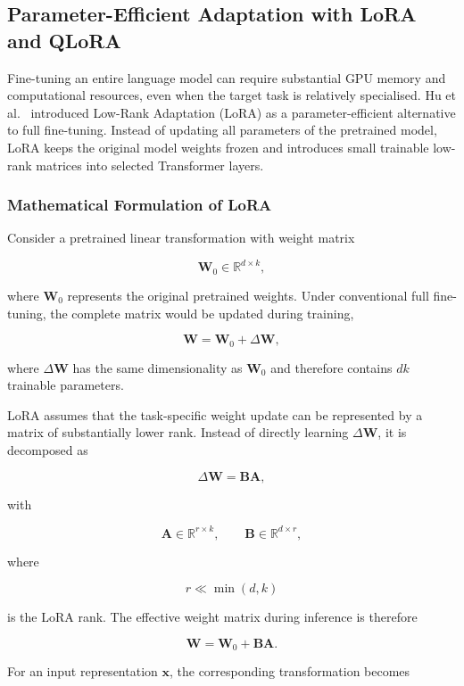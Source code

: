 \documentclass[11pt,a4paper]{article}
\begin{document}
\subsection{Parameter-Efficient Adaptation with LoRA and QLoRA}

Fine-tuning an entire language model can require substantial GPU memory and
computational resources, even when the target task is relatively specialised.
Hu et al.~\cite{hu2021lora} introduced Low-Rank Adaptation (LoRA) as a
parameter-efficient alternative to full fine-tuning. Instead of updating all
parameters of the pretrained model, LoRA keeps the original model weights
frozen and introduces small trainable low-rank matrices into selected
Transformer layers.

\subsubsection{Mathematical Formulation of LoRA}

Consider a pretrained linear transformation with weight matrix

\[
    \mathbf{W}_0 \in \mathbb{R}^{d \times k},
\]

where $\mathbf{W}_0$ represents the original pretrained weights. Under
conventional full fine-tuning, the complete matrix would be updated during
training,

\[
    \mathbf{W} = \mathbf{W}_0 + \Delta \mathbf{W},
\]

where $\Delta\mathbf{W}$ has the same dimensionality as
$\mathbf{W}_0$ and therefore contains $dk$ trainable parameters.

LoRA assumes that the task-specific weight update can be represented by a
matrix of substantially lower rank. Instead of directly learning
$\Delta\mathbf{W}$, it is decomposed as

\[
    \Delta\mathbf{W} = \mathbf{B}\mathbf{A},
\]

with

\[
    \mathbf{A} \in \mathbb{R}^{r \times k},
    \qquad
    \mathbf{B} \in \mathbb{R}^{d \times r},
\]

where

\[
    r \ll \min(d,k)
\]

is the LoRA rank. The effective weight matrix during inference is therefore

\[
    \mathbf{W}
    =
    \mathbf{W}_0
    +
    \mathbf{B}\mathbf{A}.
\]

For an input representation $\mathbf{x}$, the corresponding transformation
becomes
\end{document}

